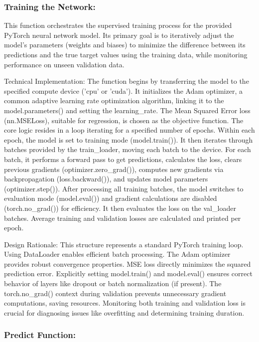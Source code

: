 \documentclass{article}
\begin{document}
\subsubsection{Training the Network: }

This function orchestrates the supervised training process for the provided PyTorch neural network model. Its primary goal is to iteratively adjust the model's parameters (weights and biases) to minimize the difference between its predictions and the true target values using the training data, while monitoring performance on unseen validation data.

Technical Implementation: The function begins by transferring the model to the specified compute device ('cpu' or 'cuda'). It initializes the Adam optimizer, a common adaptive learning rate optimization algorithm, linking it to the model.parameters() and setting the learning_rate. The Mean Squared Error loss (nn.MSELoss), suitable for regression, is chosen as the objective function. The core logic resides in a loop iterating for a specified number of epochs. Within each epoch, the model is set to training mode (model.train()). It then iterates through batches provided by the train_loader, moving each batch to the device. For each batch, it performs a forward pass to get predictions, calculates the loss, clears previous gradients (optimizer.zero_grad()), computes new gradients via backpropagation (loss.backward()), and updates model parameters (optimizer.step()). After processing all training batches, the model switches to evaluation mode (model.eval()) and gradient calculations are disabled (torch.no_grad()) for efficiency. It then evaluates the loss on the val_loader batches. Average training and validation losses are calculated and printed per epoch.

Design Rationale: This structure represents a standard PyTorch training loop. Using DataLoader enables efficient batch processing. The Adam optimizer provides robust convergence properties. MSE loss directly minimizes the squared prediction error. Explicitly setting model.train() and model.eval() ensures correct behavior of layers like dropout or batch normalization (if present). The torch.no_grad() context during validation prevents unnecessary gradient computations, saving resources. Monitoring both training and validation loss is crucial for diagnosing issues like overfitting and determining training duration.\\

\subsubsection{Predict Function: }
\end{document}
